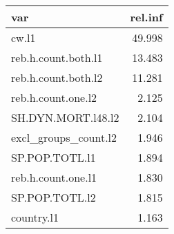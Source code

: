 \begin{tabular}{lr}
  \hline
var & rel.inf \\ 
  \hline
cw.l1 & 49.998 \\ 
  reb.h.count.both.l1 & 13.483 \\ 
  reb.h.count.both.l2 & 11.281 \\ 
  reb.h.count.one.l2 & 2.125 \\ 
  SH.DYN.MORT.l48.l2 & 2.104 \\ 
  excl\_groups\_count.l2 & 1.946 \\ 
  SP.POP.TOTL.l1 & 1.894 \\ 
  reb.h.count.one.l1 & 1.830 \\ 
  SP.POP.TOTL.l2 & 1.815 \\ 
  country.l1 & 1.163 \\ 
   \hline
\end{tabular}
